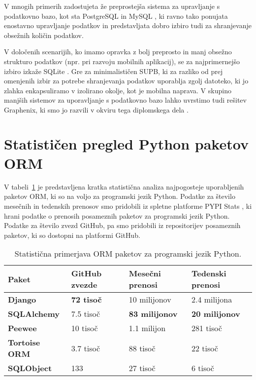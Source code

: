 \documentclass[a4paper,12pt,openright]{book}
\begin{document}
    V mnogih primerih zadostujeta že preprostejša sistema za upravljanje s podatkovno bazo, kot sta PostgreSQL \cite{POSTGRESQL} in MySQL \cite{MYSQL}, ki ravno tako ponujata enostavno upravljanje podatkov in predstavljata dobro izbiro tudi za shranjevanje obsežnih količin podatkov. 
    
    V določenih scenarijih, ko imamo opravka z bolj preprosto in manj obsežno strukturo podatkov (npr. pri razvoju mobilnih aplikacij), se za najprimernejšo izbiro izkaže SQLite \cite{SQLITE}. Gre za minimalističen SUPB, ki za razliko od prej omenjenih izbir za potrebe shranjevanja podatkov uporablja zgolj datoteko, ki jo zlahka enkapsuliramo v izolirano okolje, kot je mobilna naprava. V skupino manjših sistemov za uporavljanje s podatkovno bazo lahko uvrstimo tudi rešitev Graphenix, ki smo jo razvili v okviru tega diplomskega dela \cite{GRAPHENIX_GITHUB}.
    
    \section{Statističen pregled Python paketov ORM}

    V tabeli~\ref{orm_library_comparison} je predstavljena kratka statistična analiza najpogosteje uporabljenih paketov ORM, ki so na voljo za programski jezik Python. Podatke za število mesečnih in tedenskih prenosov smo pridobili iz spletne platforme PYPI Stats \cite{pypistats}, ki hrani podatke o prenosih posameznih paketov za programski jezik Python. Podatke za število zvezd GitHub, pa smo pridobili iz repositorijev posameznih paketov, ki so dostopni na platformi GitHub.
    
    \begin{table}[htbp]
        \begin{center}
            \begin{tabular}{p{}|p{}|p{}|p{}}
              {\bf Paket} & {\bf GitHub zvezde} & {\bf Mesečni prenosi} & {\bf Tedenski prenosi} \\ \hline
              {\bf Django \cite{DJANGO_GITHUB}} & \textbf{\num{72} tisoč} & \num{10} milijonov & \num{2,4} milijona \\
              {\bf SQLAlchemy \cite{SQLALCHEMY_GITHUB}} & \num{7,5} tisoč &  \textbf{\num{83} milijonov} & \textbf{\num{20} milijonov} \\
              {\bf Peewee \cite{PEEWEE_GITHUB}} & \num{10} tisoč & \num{1,1} milijon & \num{281} tisoč \\
              {\bf Tortoise ORM \cite{TORTOISE_GITHUB}} & \num{3,7} tisoč & \num{88} tisoč & \num{22} tisoč \\
              {\bf SQLObject \cite{SQLOBJECT_GITHUB}} & 133 & \num{27} tisoč & \num{6} tisoč \\
            \end{tabular}
        \end{center}
        \caption{Statistična primerjava ORM paketov za programski jezik Python.}
        \label{orm_library_comparison}
    \end{table}
    
\end{document}
